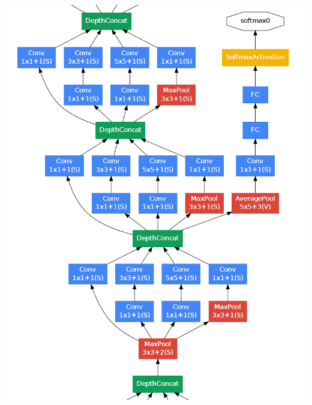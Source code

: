 \begin{frame}[allowframebreaks]
\begin{columns}
		\begin{column}{.4\textwidth}
			\begin{center}
				\includegraphics[scale=0.5]{figs/GoogleNet_scheme_1}
			\end{center}
		\end{column}





\end{columns}
\end{frame}
